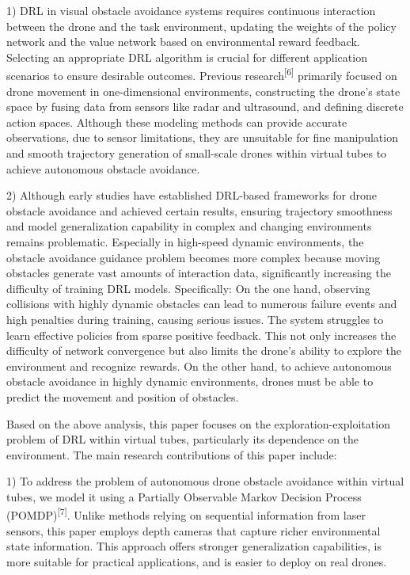 \documentclass{aas}
\begin{document}
1)  DRL in visual obstacle avoidance systems requires continuous interaction between the drone and the task environment, updating the weights of the policy network and the value network based on environmental reward feedback. Selecting an appropriate DRL algorithm is crucial for different application scenarios to ensure desirable outcomes. Previous research\textsuperscript{[6]} primarily focused on drone movement in one-dimensional environments, constructing the drone's state space by fusing data from sensors like radar and ultrasound, and defining discrete action spaces. Although these modeling methods can provide accurate observations, due to sensor limitations, they are unsuitable for fine manipulation and smooth trajectory generation of small-scale drones within virtual tubes to achieve autonomous obstacle avoidance.

2)  Although early studies have established DRL-based frameworks for drone obstacle avoidance and achieved certain results, ensuring trajectory smoothness and model generalization capability in complex and changing environments remains problematic. Especially in high-speed dynamic environments, the obstacle avoidance guidance problem becomes more complex because moving obstacles generate vast amounts of interaction data, significantly increasing the difficulty of training DRL models. Specifically: On the one hand, observing collisions with highly dynamic obstacles can lead to numerous failure events and high penalties during training, causing serious issues. The system struggles to learn effective policies from sparse positive feedback. This not only increases the difficulty of network convergence but also limits the drone's ability to explore the environment and recognize rewards. On the other hand, to achieve autonomous obstacle avoidance in highly dynamic environments, drones must be able to predict the movement and position of obstacles.

Based on the above analysis, this paper focuses on the exploration-exploitation problem of DRL within virtual tubes, particularly its dependence on the environment. The main research contributions of this paper include:

1)  To address the problem of autonomous drone obstacle avoidance within virtual tubes, we model it using a Partially Observable Markov Decision Process (POMDP)\textsuperscript{[7]}. Unlike methods relying on sequential information from laser sensors, this paper employs depth cameras that capture richer environmental state information. This approach offers stronger generalization capabilities, is more suitable for practical applications, and is easier to deploy on real drones.
\end{document}
